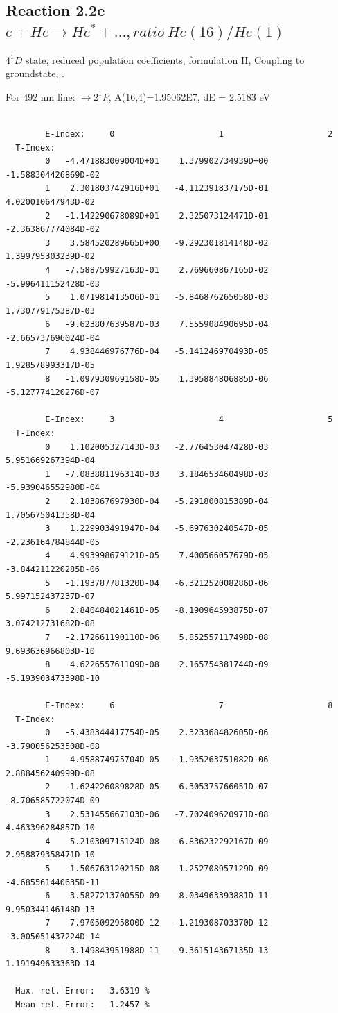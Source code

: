 \documentclass[12pt,dvips]{article}
\begin{document}
\subsection{
  Reaction 2.2e $e + He \rightarrow He^* + ...,  ratio ~ He(16)/He(1)$
}

  $4^1D$ state,
  reduced population coefficients, formulation II,
  Coupling to groundstate, \cite{kn:Fujimoto} .

  For 492 nm line: $\rightarrow 2^1P$, A(16,4)=1.95062E7, dE = 2.5183 eV

\begin{small}\begin{verbatim}

        E-Index:     0                     1                     2
  T-Index:
        0   -4.471883009004D+01    1.379902734939D+00   -1.588304426869D-02
        1    2.301803742916D+01   -4.112391837175D-01    4.020010647943D-02
        2   -1.142290678089D+01    2.325073124471D-01   -2.363867774084D-02
        3    3.584520289665D+00   -9.292301814148D-02    1.399795303239D-02
        4   -7.588759927163D-01    2.769660867165D-02   -5.996411152428D-03
        5    1.071981413506D-01   -5.846876265058D-03    1.730779175387D-03
        6   -9.623807639587D-03    7.555908490695D-04   -2.665737696024D-04
        7    4.938446976776D-04   -5.141246970493D-05    1.928578993317D-05
        8   -1.097930969158D-05    1.395884806885D-06   -5.127774120276D-07

        E-Index:     3                     4                     5
  T-Index:
        0    1.102005327143D-03   -2.776453047428D-03    5.951669267394D-04
        1   -7.083881196314D-03    3.184653460498D-03   -5.939046552980D-04
        2    2.183867697930D-04   -5.291800815389D-04    1.705675041358D-04
        3    1.229903491947D-04   -5.697630240547D-05   -2.236164784844D-05
        4    4.993998679121D-05    7.400566057679D-05   -3.844211220285D-06
        5   -1.193787781320D-04   -6.321252008286D-06    5.997152437237D-07
        6    2.840484021461D-05   -8.190964593875D-07    3.074212731682D-08
        7   -2.172661190110D-06    5.852557117498D-08    9.693636966803D-10
        8    4.622655761109D-08    2.165754381744D-09   -5.193903473398D-10

        E-Index:     6                     7                     8
  T-Index:
        0   -5.438344417754D-05    2.323368482605D-06   -3.790056253508D-08
        1    4.958874975704D-05   -1.935263751082D-06    2.888456240999D-08
        2   -1.624226089828D-05    6.305375766051D-07   -8.706585722074D-09
        3    2.531455667103D-06   -7.702409620971D-08    4.463396284857D-10
        4    5.210309715124D-08   -6.836232292167D-09    2.958879358471D-10
        5   -1.506763120215D-08    1.252708957129D-09   -4.685561440635D-11
        6   -3.582721370055D-09    8.034963393881D-11    9.950344146148D-13
        7    7.970509295800D-12   -1.219308703370D-12   -3.005051437224D-14
        8    3.149843951988D-11   -9.361514367135D-13    1.191949633363D-14

  Max. rel. Error:   3.6319 %
  Mean rel. Error:   1.2457 %



\end{verbatim}\end{small}
\end{document}
